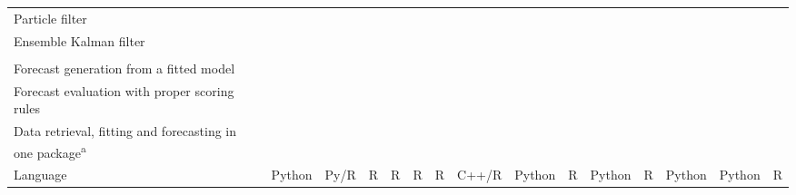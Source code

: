\begin{table}[tb]
\begin{tabular}{@{}lcccccccccccccc@{}}
\quad Particle filter & \mkfull{} & \mknone{} & \mknone{} & \mkfull{} & \mkfull{} & \mkfull{} & \mkfull{} & \mkfull{} & \mkfull{} & \mknone{} & \mknone{} & \mknone{} & \mknone{} & \mknone{} \\
\quad Ensemble Kalman filter & \mkfull{} & \mknone{} & \mknone{} & \mkfull{} & \mkfull{} & \mknone{} & \mknone{} & \mknone{} & \mknone{} & \mknone{} & \mknone{} & \mknone{} & \mknone{} & \mknone{} \\
\addlinespace[3pt]
\multicolumn{15}{@{}l}{\textbf{Forecasting}} \\
\quad Forecast generation from a fitted model & \mkfull{} & \mkfull{} & \mknone{} & \mknone{} & \mknone{} & \mkfull{} & \mkfull{} & \mkfull{} & \mknone{} & \mkfull{} & \mkfull{} & \mkfull{} & \mknone{} & \mkfull{} \\
\quad Forecast evaluation with proper scoring rules & \mknone{} & \mknone{} & \mknone{} & \mknone{} & \mknone{} & \mknone{} & \mknone{} & \mkfull{} & \mknone{} & \mknone{} & \mkfull{} & \mknone{} & \mknone{} & \mknone{} \\
\quad Data retrieval, fitting and forecasting in one package\textsuperscript{a} & \mkfull{} & \mkfull{} & \mknone{} & \mknone{} & \mknone{} & \mknone{} & \mknone{} & \mknone{} & \mknone{} & \mknone{} & \mknone{} & \mknone{} & \mknone{} & \mknone{} \\
\midrule
\quad Language & Python & Py/R & R & R & R & R & C++/R & Python & R & Python & R & Python & Python & R \\
\bottomrule
\end{tabular}
\end{table}
